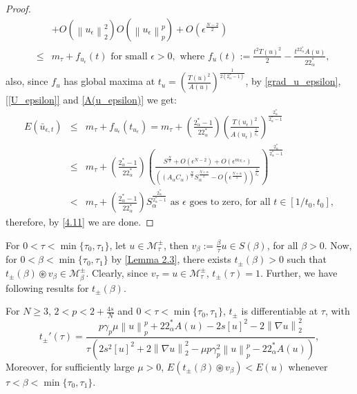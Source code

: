 \documentclass[11pt]{article}
\numberwithin{equation}{section}
\numberwithin{mytheorem}{section}
\begin{document}
\begin{proof}
\begin{eqnarray*}
				&& +O(\left\| u_{\epsilon}\right\|_2^2)O(\left\| u_{\epsilon}\right\|_p^p)+O(\epsilon^{\frac{N-2}{2}})\\
				& \leq & m_{\tau} +f_{u_{\epsilon}}(t) \text{ for small } \epsilon>0,\text{ where }f_{u}(t):=\frac{t^2T(u)^2}{2}-\frac{t^{22^*_{\alpha}}A(u)}{22^*_{\alpha}},
			\end{eqnarray*}
			also, since $f_u$ has global maxima at $t_u=\left(\frac{T(u)^2}{A(u)}\right)^{\frac{1}{2(2^*_{\alpha}-1)}}$, by \eqref{grad_u_epsilon}, \eqref{[U_epsilon]} and \eqref{A(u_epsilon)} we get:
			\begin{eqnarray*}
				E(\bar{u}_{\epsilon,t}) & \leq & m_{\tau} +f_{u_{\epsilon}}(t_{u_{\epsilon}}) =m_{\tau}+\left(\frac{2^*_{\alpha}-1}{22^*_{\alpha}}\right)\left(\frac{T(u_{\epsilon})^2}{A(u_{\epsilon})^{\frac{1}{2^*_{\alpha}}}}\right)^{\frac{2^*_{\alpha}}{2^*_{\alpha}-1}}\\
				& \leq & m_{\tau} +  \left(\frac{2^*_{\alpha}-1}{22^*_{\alpha}}\right)\left(\frac{S^{\frac{N}{2}}+O(\epsilon^{N-2})+O(\epsilon^{m_{N,s}})}{\left((A_{\alpha}C_{\alpha})^{\frac{N}{2}}S_{\alpha}^{\frac{N+\alpha}{2}}-O(\epsilon^{\frac{N+\alpha}{2}})\right)^{\frac{1}{2^*_{\alpha}}}}\right)^{\frac{2^*_{\alpha}}{2^*_{\alpha}-1}}\\
				& < & m_{\tau}+\left(\frac{2^*_{\alpha}-1}{22^*_{\alpha}}\right)S_{\alpha}^{\frac{2^*_{\alpha}}{2^*_{\alpha}-1}} \text{ as } \epsilon \text{ goes to zero, for all } t\in [1/t_0,t_0],
			\end{eqnarray*}
			therefore, by \eqref{4.11} we are done. 
		\end{proof}
		\noindent For $0<\tau<\min\{\tau_0,\tau_1\}$, let $u\in \mathcal{M}_{\tau}^{\pm}$, then $v_{\beta}:=\frac{\beta}{\tau}u\in S(\beta)$, for all $\beta>0$. Now, for $0<\beta<\min\{\tau_0,\tau_1\}$  by \autoref{Lemma 2.3}, there exists $t_{\pm}(\beta)>0$ such that $t_{\pm}(\beta)\circledast v_{\beta}\in \mathcal{M}_{\beta}^{\pm}$.  Clearly, since $v_{\tau}=u\in \mathcal{M}_{\tau}^{\pm}$, $t_{\pm}(\tau)=1$. Further, we have following results for $t_{\pm}(\beta)$.
		\begin{lemma}\label{Lemma 4.2}
			For $N\geq 3$, $2<p<2+\frac{4s}{N}$ and $0<\tau<\min\{\tau_0,\tau_1\}$, $t_{\pm}$ is differentiable at $\tau$, with
			\begin{equation*}
				t_{\pm}'(\tau) =\frac{p\gamma_p\mu\left\| u \right\|_p^p+22^*_{\alpha}A(u)-2s[u]^2-2\left\| \nabla u \right\|_2^2}{\tau\left(2s^2[u]^2+2\left\| \nabla u \right\|_2^2-\mu p\gamma_p^2\left\| u \right\|_p^p-22^*_{\alpha}A(u)\right)},
			\end{equation*}
			Moreover, for sufficiently large $\mu>0$, $E(t_{\pm}(\beta)\circledast v_{\beta})<E(u)$ whenever $\tau<\beta<\min\{\tau_0,\tau_1\}$.
		\end{lemma}
\end{document}
